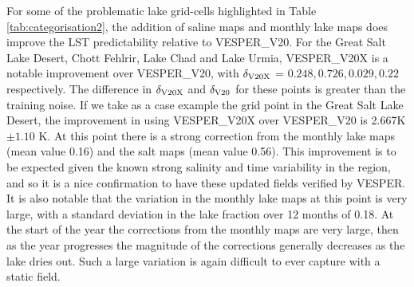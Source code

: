 \documentclass[hess, twostagejnl]{copernicus}
\begin{document}
For some of the problematic lake grid-cells highlighted in Table \ref{tab:categorisation2}, the addition of saline maps and monthly lake maps does improve the LST predictability relative to VESPER\_V20. For the Great Salt Lake Desert, Chott Fehlrir, Lake Chad and Lake Urmia, VESPER\_V20X is a notable improvement over VESPER\_V20, with $\delta_{\rm V20X}$ = $0.248,0.726,0.029,0.22$ respectively. The difference in  $\delta_{\rm V20X}$ and $\delta_{\rm V20}$ for these points is greater than the training noise. If we take as a case example the grid point in the Great Salt Lake Desert, the improvement in using  VESPER\_V20X over VESPER\_V20 is 2.667K $\pm 1.10$ K. At this point there is a strong correction from the monthly lake maps (mean value 0.16) and the salt maps (mean value 0.56). This improvement is to be expected given the known strong salinity and time variability in the region, and so it is a nice confirmation to have these updated fields verified by VESPER. It is also notable that the variation in the monthly lake maps at this point is very large, with a standard deviation in the lake fraction over 12 months of 0.18. At the start of the year the corrections from the monthly maps are very large, then as the year progresses the magnitude of the corrections generally decreases as the lake dries out. Such a large variation is again difficult to ever capture with a static field. \newline 
\end{document}
